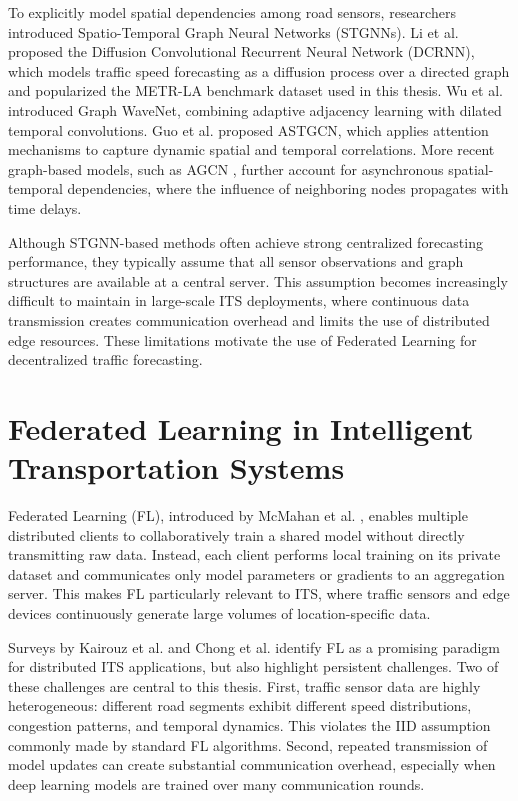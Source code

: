 To explicitly model spatial dependencies among road sensors, researchers introduced Spatio-Temporal Graph Neural Networks (STGNNs). Li et al. \cite{li2018} proposed the Diffusion Convolutional Recurrent Neural Network (DCRNN), which models traffic speed forecasting as a diffusion process over a directed graph and popularized the METR-LA benchmark dataset used in this thesis. Wu et al. \cite{wu2019graphwavenet} introduced Graph WaveNet, combining adaptive adjacency learning with dilated temporal convolutions. Guo et al. \cite{guo2019} proposed ASTGCN, which applies attention mechanisms to capture dynamic spatial and temporal correlations. More recent graph-based models, such as AGCN \cite{qi2023fedagcn}, further account for asynchronous spatial-temporal dependencies, where the influence of neighboring nodes propagates with time delays.

Although STGNN-based methods often achieve strong centralized forecasting performance, they typically assume that all sensor observations and graph structures are available at a central server. This assumption becomes increasingly difficult to maintain in large-scale ITS deployments, where continuous data transmission creates communication overhead and limits the use of distributed edge resources. These limitations motivate the use of Federated Learning for decentralized traffic forecasting.

\section{Federated Learning in Intelligent Transportation Systems}

Federated Learning (FL), introduced by McMahan et al. \cite{mcmahan2017}, enables multiple distributed clients to collaboratively train a shared model without directly transmitting raw data. Instead, each client performs local training on its private dataset and communicates only model parameters or gradients to an aggregation server. This makes FL particularly relevant to ITS, where traffic sensors and edge devices continuously generate large volumes of location-specific data.

Surveys by Kairouz et al. \cite{kairouz2021} and Chong et al. \cite{chong2025} identify FL as a promising paradigm for distributed ITS applications, but also highlight persistent challenges. Two of these challenges are central to this thesis. First, traffic sensor data are highly heterogeneous: different road segments exhibit different speed distributions, congestion patterns, and temporal dynamics. This violates the IID assumption commonly made by standard FL algorithms. Second, repeated transmission of model updates can create substantial communication overhead, especially when deep learning models are trained over many communication rounds.

